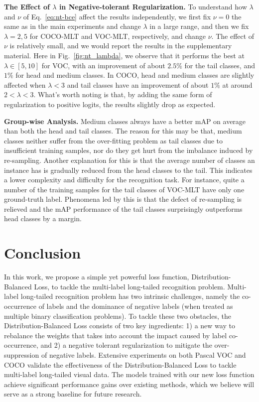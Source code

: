 \documentclass[runningheads]{llncs}
\begin{document}
\noindent\textbf{The Effect of $\lambda$ in Negative-tolerant Regularization.}
To understand how $\lambda$ and $\nu$ of Eq.~\ref{eq:nt-bce} affect the results independently, we first fix $\nu=0$ the same as in the main experiments and change $\lambda$ in a large range, and then we fix $\lambda=2,5$ for COCO-MLT and VOC-MLT, respectively, and change $\nu$.
The effect of $\nu$ is relatively small, and we would report the results in the supplementary material.
Here in Fig.~\ref{fig:nt_lambda}, we observe that it performs the best at $\lambda\in [5,10]$ for VOC, with an improvement of about $2.5\%$ for the tail classes, and $1\%$ for head and medium classes. In COCO, head and medium classes are slightly affected when $\lambda<3$ and tail classes have an improvement of about $1\%$ at around $2<\lambda<3$.
What's worth noting is that, by adding the same form of regularization to positive logits, the results slightly drop as expected.

\noindent\textbf{Group-wise Analysis.}
Medium classes always have a better mAP on average than both the head and tail classes.
The reason for this may be that, medium classes neither suffer from the over-fitting problem as tail classes due to insufficient training samples, nor do they get hurt from the imbalance induced by re-sampling.
Another explanation for this is that the average number of classes an instance has is gradually reduced from the head classes to the tail. This indicates a lower complexity and difficulty for the recognition task. 
For instance, quite a number of the training samples for the tail classes of VOC-MLT have only one ground-truth label. Phenomena led by this is that the defect of re-sampling is relieved and the mAP performance of the tail classes surprisingly outperforms head classes by a margin.
 

\section{Conclusion}
\label{sec:conclusion}

In this work, we propose a simple yet powerful loss function, Distribution-Balanced Loss, to tackle the multi-label long-tailed recognition problem. Multi-label long-tailed recognition problem has two intrinsic challenges, namely the co-occurrence of labels and the dominance of negative labels (when treated as multiple binary classification problems). To tackle these two obstacles, the Distribution-Balanced Loss consists of two key ingredients: 1) a new way to rebalance the weights that takes into account the impact caused by label co-occurrence, and 2) a negative tolerant regularization to mitigate the over-suppression of negative labels. Extensive experiments on both Pascal VOC and COCO validate the effectiveness of the Distribution-Balanced Loss to tackle multi-label long-tailed visual data. The models trained with our new loss function achieve significant performance gains over existing methods, which we believe will serve as a strong baseline for future research.
\end{document}
